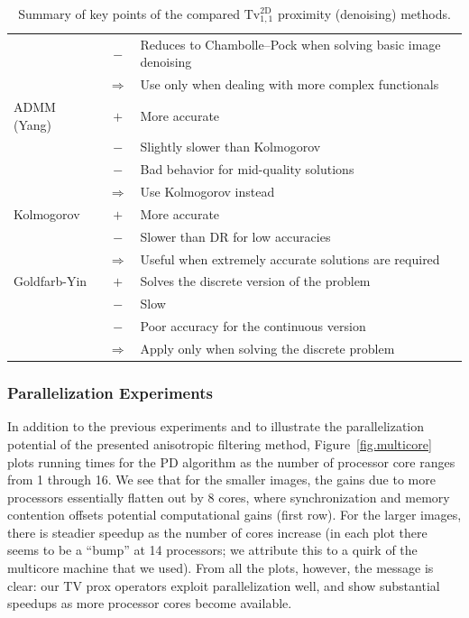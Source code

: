 \documentclass[twoside,11pt]{article}
\def\abovestrut#1{\rule[0in]{0in}{#1}\ignorespaces}
\def\belowstrut#1{\rule[-#1]{0in}{#1}\ignorespaces}
\def\abovespace{\abovestrut{0.20in}}
\def\belowspace{\belowstrut{0.10in}}
\newcommand{\tvell}{\text{Tv}}
\newcommand{\twod}{\text{2D}}
\numberwithin{equation}{section}
\numberwithin{theorem}{section}
\begin{document}
\begin{table}[tbp]
\begin{tabular}{lcp{}}
       & \color{blue}$-$ & Reduces to Chambolle--Pock when solving basic image denoising \\
       & $\Rightarrow$ & Use only when dealing with more complex functionals \belowspace\\
\hline
\abovespace
ADMM (Yang) & \color{red}$+$ & More accurate \\
     & \color{blue}$-$ & Slightly slower than Kolmogorov \\
     & \color{blue}$-$ & Bad behavior for mid-quality solutions \\
     & $\Rightarrow$ & Use Kolmogorov instead \belowspace\\
\hline
\abovespace
Kolmogorov & \color{red}$+$ & More accurate \\
     & \color{blue}$-$ & Slower than DR for low accuracies \\
     & $\Rightarrow$ & Useful when extremely accurate solutions are required \belowspace\\
\hline
\abovespace
Goldfarb-Yin & \color{red}$+$ & Solves the discrete version of the problem \\
             & \color{blue}$-$ & Slow \\
             & \color{blue}$-$ & Poor accuracy for the continuous version \\
             & $\Rightarrow$ & Apply only when solving the discrete problem \belowspace\\
\hline
\end{tabular}
\caption{\small Summary of key points of the compared $\tvell_{1,1}^{\twod}$ proximity (denoising) methods.
\label{tab:2DmethodsComparison}
}
\end{table}

\subsubsection{Parallelization Experiments}
In addition to the previous experiments and to illustrate the parallelization potential of the presented anisotropic filtering method, Figure~\ref{fig.multicore} plots running times for the PD algorithm as the number of processor core ranges from 1 through 16. We see that for the smaller images, the gains due to more processors essentially flatten out by 8 cores, where synchronization and memory contention offsets potential computational gains (first row). For the larger images, there is steadier speedup as the number of cores increase (in each plot there seems to be a ``bump'' at 14 processors; we attribute this to a quirk of the multicore machine that we used). From all the plots, however, the message is clear: our TV prox operators exploit parallelization well, and show substantial speedups as more processor cores become available.
\end{document}
